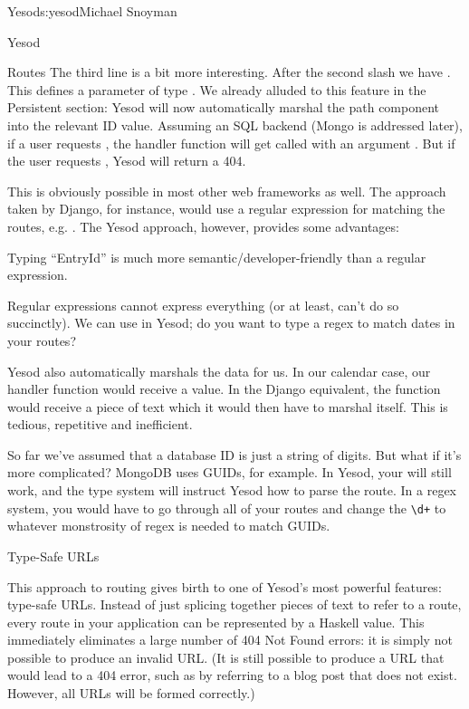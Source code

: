 \begin{aosachapter}{Yesod}{s:yesod}{Michael Snoyman}
\begin{aosasect1}{Yesod}
\begin{aosasect2}{Routes}
The third line is a bit more interesting. After the second slash we
have . This defines a parameter of type
. We already alluded to this
feature in the Persistent section: Yesod will now automatically marshal the path component into
the relevant ID value. Assuming an SQL backend (Mongo is addressed
later), if a user requests , the handler function will
get called with an argument . But if the user requests
, Yesod will return a 404.

This is obviously possible in most other web frameworks as well. The
approach taken by Django, for instance, would use a regular expression
for matching the routes, e.g. . The Yesod
approach, however, provides some advantages:

\begin{aosaitemize}

\item Typing ``EntryId'' is much more semantic/developer-friendly than a
  regular expression.

\item Regular expressions cannot express everything (or at least,
  can't do so succinctly). We can use  in Yesod;
  do you want to type a regex to match dates in your routes?

\item Yesod also automatically marshals the data for us. In our
  calendar case, our handler function would receive a 
  value. In the Django equivalent, the function would receive a piece
  of text which it would then have to marshal itself. This is tedious,
  repetitive and inefficient.

\item So far we've assumed that a database ID is just a string of
  digits. But what if it's more complicated? MongoDB uses GUIDs, for
  example. In Yesod, your  will still work, and the type
  system will instruct Yesod how to parse the route. In a regex
  system, you would have to go through all of your routes and change
  the \verb=\d+= to whatever monstrosity of regex is needed to match GUIDs.

\end{aosaitemize}

\begin{aosasect3}{Type-Safe URLs}

This approach to routing gives birth to one of Yesod's most powerful
features: type-safe URLs. Instead of just splicing together pieces of
text to refer to a route, every route in your application can be
represented by a Haskell value. This immediately eliminates a large
number of 404 Not Found errors: it is simply not possible to produce
an invalid URL.  (It is still possible to produce a URL that would lead to a 404 error, such as
by referring to a blog post that does not exist. However, all URLs
will be formed correctly.)


\end{aosasect3}
\end{aosasect2}
\end{aosasect1}
\end{aosachapter}
